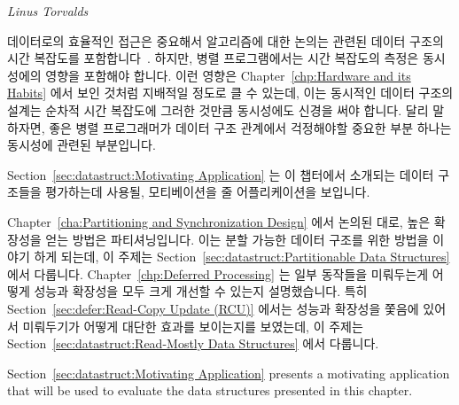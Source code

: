 
%
	 {\emph{Linus Torvalds}}

데이터로의 효율적인 접근은 중요해서 알고리즘에 대한 논의는 관련된 데이터 구조의
시간 복잡도를 포함합니다~\cite{ThomasHCorman2001Algorithms}.
하지만, 병렬 프로그램에서는 시간 복잡도의 측정은 동시성에의 영향을 포함해야 합니다.
이런 영향은 Chapter~\ref{chp:Hardware and its Habits} 에서 보인 것처럼 지배적일
정도로 클 수 있는데, 이는 동시적인 데이터 구조의 설계는 순차적 시간 복잡도에
그러한 것만큼 동시성에도 신경을 써야 합니다.
달리 말하자면, 좋은 병렬 프로그래머가 데이터 구조 관계에서 걱정해야할 중요한
부분 하나는 동시성에 관련된 부분입니다.

Section~\ref{sec:datastruct:Motivating Application}
는 이 챕터에서 소개되는 데이터 구조들을 평가하는데 사용될, 모티베이션을 줄
어플리케이션을 보입니다.

Chapter~\ref{cha:Partitioning and Synchronization Design} 에서 논의된 대로,
높은 확장성을 얻는 방법은 파티셔닝입니다.
이는 분할 가능한 데이터 구조를 위한 방법을 이야기 하게 되는데, 이 주제는
Section~\ref{sec:datastruct:Partitionable Data Structures} 에서 다룹니다.
Chapter~\ref{chp:Deferred Processing} 는 일부 동작들을 미뤄두는게 어떻게 성능과
확장성을 모두 크게 개선할 수 있는지 설명했습니다.
특히 Section~\ref{sec:defer:Read-Copy Update (RCU)} 에서는 성능과 확장성을
쫓음에 있어서 미뤄두기가 어떻게 대단한 효과를 보이는지를 보였는데, 이 주제는
Section~\ref{sec:datastruct:Read-Mostly Data Structures} 에서 다룹니다.
\iffalse

Section~\ref{sec:datastruct:Motivating Application}
presents a motivating application that will be used to evaluate
the data structures presented in this chapter.

